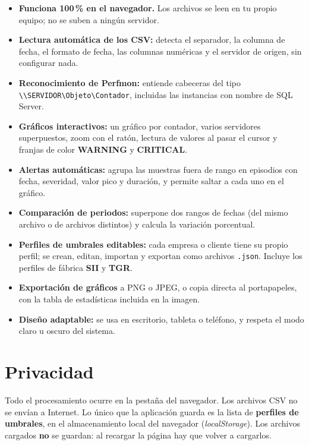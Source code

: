 \documentclass[11pt,a4paper,oneside]{report}
\newcommand{\bs}{\textbackslash}
\newcommand{\warnz}{\textsf{\textbf{\color{warnc}WARNING}}}
\newcommand{\critz}{\textsf{\textbf{\color{critc}CRITICAL}}}
\begin{document}
\begin{itemize}
  \item \textbf{Funciona 100\,\% en el navegador.} Los archivos se leen en tu
        propio equipo; no se suben a ningún servidor.
  \item \textbf{Lectura automática de los CSV:} detecta el separador, la
        columna de fecha, el formato de fecha, las columnas numéricas y el
        servidor de origen, sin configurar nada.
  \item \textbf{Reconocimiento de Perfmon:} entiende cabeceras del
        tipo \texttt{\bs\bs SERVIDOR\bs\allowbreak Objeto\bs\allowbreak Contador}, incluidas las instancias
        con nombre de SQL Server.
  \item \textbf{Gráficos interactivos:} un gráfico por contador, varios
        servidores superpuestos, zoom con el ratón, lectura de valores al pasar
        el cursor y franjas de color \warnz{} y \critz.
  \item \textbf{Alertas automáticas:} agrupa las muestras fuera de rango en
        episodios con fecha, severidad, valor pico y duración, y permite saltar
        a cada uno en el gráfico.
  \item \textbf{Comparación de periodos:} superpone dos rangos de fechas (del
        mismo archivo o de archivos distintos) y calcula la variación
        porcentual.
  \item \textbf{Perfiles de umbrales editables:} cada empresa o cliente tiene su
        propio perfil; se crean, editan, importan y exportan como archivos
        \texttt{.json}. Incluye los perfiles de fábrica \textbf{SII} y
        \textbf{TGR}.
  \item \textbf{Exportación de gráficos} a PNG o JPEG, o copia directa al
        portapapeles, con la tabla de estadísticas incluida en la imagen.
  \item \textbf{Diseño adaptable:} se usa en escritorio, tableta o teléfono, y
        respeta el modo claro u oscuro del sistema.
\end{itemize}

\section{Privacidad}

Todo el procesamiento ocurre en la pestaña del navegador. Los archivos CSV no
se envían a Internet. Lo único que la aplicación guarda es la lista de
\textbf{perfiles de umbrales}, en el almacenamiento local del navegador
(\emph{localStorage}). Los archivos cargados \textbf{no} se guardan: al
recargar la página hay que volver a cargarlos.
\end{document}
